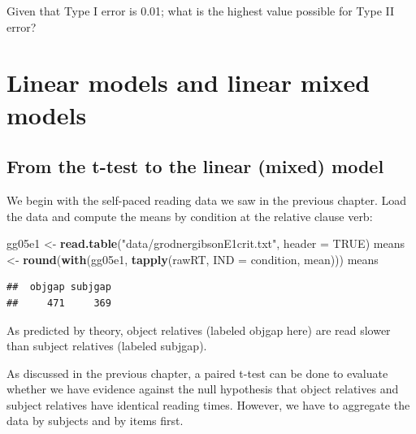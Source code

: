 \documentclass[12pt,]{krantz}
\newenvironment{Shaded}{\begin{snugshade}}{\end{snugshade}}
\newcommand{\DataTypeTok}[1]{\textcolor[rgb]{0.13,0.29,0.53}{#1}}
\newcommand{\KeywordTok}[1]{\textcolor[rgb]{0.13,0.29,0.53}{\textbf{#1}}}
\newcommand{\NormalTok}[1]{#1}
\newcommand{\OperatorTok}[1]{\textcolor[rgb]{0.81,0.36,0.00}{\textbf{#1}}}
\newcommand{\OtherTok}[1]{\textcolor[rgb]{0.56,0.35,0.01}{#1}}
\newcommand{\StringTok}[1]{\textcolor[rgb]{0.31,0.60,0.02}{#1}}
\begin{document}
Given that Type I error is 0.01; what is the highest value possible for Type II error?

\hypertarget{linear-models-and-linear-mixed-models}{%
\chapter{Linear models and linear mixed models}\label{linear-models-and-linear-mixed-models}}

\hypertarget{from-the-t-test-to-the-linear-mixed-model}{%
\section{From the t-test to the linear (mixed) model}\label{from-the-t-test-to-the-linear-mixed-model}}

We begin with the \citet{grodner} self-paced reading data we saw in the previous chapter. Load the data and compute the means by condition at the relative clause verb:

\begin{Shaded}
\begin{Highlighting}[]
\NormalTok{gg05e1 <-}\StringTok{ }\KeywordTok{read.table}\NormalTok{(}\StringTok{"data/grodnergibsonE1crit.txt"}\NormalTok{, }
  \DataTypeTok{header =} \OtherTok{TRUE}\NormalTok{)}
\NormalTok{means <-}\StringTok{ }\KeywordTok{round}\NormalTok{(}\KeywordTok{with}\NormalTok{(gg05e1, }\KeywordTok{tapply}\NormalTok{(rawRT, }
  \DataTypeTok{IND =}\NormalTok{ condition, mean)))}
\NormalTok{means}
\end{Highlighting}
\end{Shaded}

\begin{verbatim}
##  objgap subjgap 
##     471     369
\end{verbatim}

As predicted by theory, object relatives (labeled objgap here) are read slower than subject relatives (labeled subjgap).

As discussed in the previous chapter, a paired t-test can be done to evaluate whether we have evidence against the null hypothesis that object relatives and subject relatives have identical reading times. However, we have to aggregate the data by subjects and by items first.

\begin{Shaded}
\end{Shaded}
\end{document}
